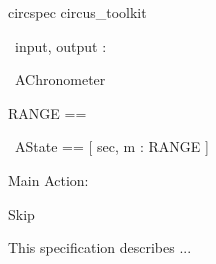 \documentclass{article}
\begin{document}
\begin{zsection}
  \SECTION circspec \parents circus\_toolkit
\end{zsection}

\begin{circus}
 \circchannel \ input, output : \nat
\end{circus}


\begin{circus}
  \circprocess\ AChronometer \circdef \ \circbegin 
\end{circus}

\begin{zed}
  RANGE == \nat
\end{zed}

\begin{circusaction}
      \circstate \ AState == [ sec, m : RANGE ] \\%
\end{circusaction}

Main Action: 
\begin{circusaction}
\circspot Skip 
\end{circusaction}

\begin{circus}
  \circend
\end{circus}

This specification describes ...
\end{document}
